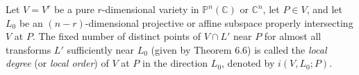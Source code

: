Let $V = V^r$ be a pure $r$-dimensional variety in $\mathbb{P}^n(\mathbb{C})$ or $\mathbb{C}^n$, let $P \in V$, and let $L_0$ be an $(n-r)$-dimensional projective or affine subspace properly intersecting $V$ at $P$. The fixed number of distinct points of $V \cap L'$ near $P$ for almost all transforms $L'$ sufficiently near $L_0$ (given by Theorem 6.6) is called the \textit{local degree} (or \textit{local order}) of $V$ at $P$ in the direction $L_0$, denoted by $i(V, L_0; P)$.
